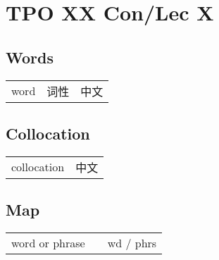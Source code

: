 \section{TPO XX Con/Lec X}

\subsection{Words}

\begin{tabular}{lll}
    word & 词性 & 中文 \\
\end{tabular}

\subsection{Collocation}

\begin{tabular}{ll}
    collocation & 中文 \\
\end{tabular}

\subsection{Map}

\begin{tabular}{rc@{\quad$\to$\quad}l}
    word or phrase &  & wd / phrs \\
\end{tabular}
